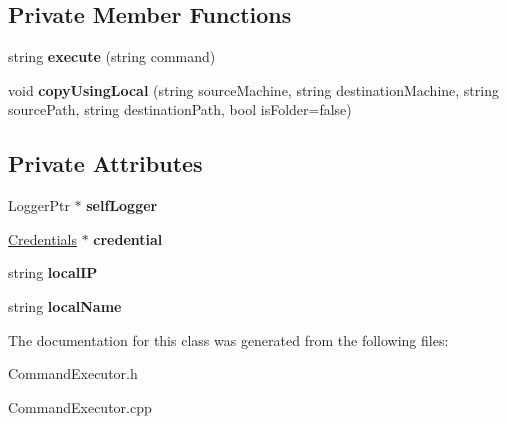\subsection*{\-Private \-Member \-Functions}
\begin{DoxyCompactItemize}
\item 
\hypertarget{classCommandExecutor_a502cdb6d7b3bda1a3eddc27f0680108c}{string {\bfseries execute} (string command)}\label{classCommandExecutor_a502cdb6d7b3bda1a3eddc27f0680108c}

\item 
\hypertarget{classCommandExecutor_a4e07531db85d984062923236eec2203b}{void {\bfseries copy\-Using\-Local} (string source\-Machine, string destination\-Machine, string source\-Path, string destination\-Path, bool is\-Folder=false)}\label{classCommandExecutor_a4e07531db85d984062923236eec2203b}

\end{DoxyCompactItemize}
\subsection*{\-Private \-Attributes}
\begin{DoxyCompactItemize}
\item 
\hypertarget{classCommandExecutor_a2e2097993d023ac18fbedc320f932f76}{\-Logger\-Ptr $\ast$ {\bfseries self\-Logger}}\label{classCommandExecutor_a2e2097993d023ac18fbedc320f932f76}

\item 
\hypertarget{classCommandExecutor_aa60dfc9bd79e5944651c076fda45b9c9}{\hyperlink{classCredentials}{\-Credentials} $\ast$ {\bfseries credential}}\label{classCommandExecutor_aa60dfc9bd79e5944651c076fda45b9c9}

\item 
\hypertarget{classCommandExecutor_ab2f51b7a27cab126c653951de8de56c3}{string {\bfseries local\-I\-P}}\label{classCommandExecutor_ab2f51b7a27cab126c653951de8de56c3}

\item 
\hypertarget{classCommandExecutor_a4e6065db901a50bfd5de0640495d9ca8}{string {\bfseries local\-Name}}\label{classCommandExecutor_a4e6065db901a50bfd5de0640495d9ca8}

\end{DoxyCompactItemize}


\-The documentation for this class was generated from the following files\-:\begin{DoxyCompactItemize}
\item 
\-Command\-Executor.\-h\item 
\-Command\-Executor.\-cpp\end{DoxyCompactItemize}
